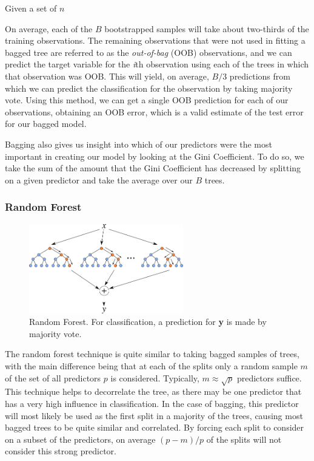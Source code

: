 \documentclass[preprint,12pt]{elsarticle}
\begin{document}
Given a set of $n$ 

On average, each of the $B$ bootstrapped samples will take about two-thirds of the training observations.  The remaining observations that were not used in fitting a bagged tree are referred to as the \textit{out-of-bag} (OOB) observations, and we can predict the target variable for the \textit{i}th observation using each of the trees in which that observation was OOB. This will yield, on average, $B/3$ predictions from which we can predict the classification for the observation by taking majority vote.\cite{ISLR} Using this method, we can get a single OOB prediction for each of our observations, obtaining an OOB error, which is a valid estimate of the test error for our bagged model.

Bagging also gives us insight into which of our predictors were the most important in creating our model by looking at the Gini Coefficient. To do so, we take the sum of the amount that the Gini Coefficient has decreased by splitting on a given predictor and take the average over our $B$ trees.

\subsubsection{Random Forest}


\begin{figure}[h]
	\centering
	\includegraphics[width=0.6\textwidth]{RF}
	\caption{Random Forest. For classification, a prediction for \textbf{y} is made by majority vote.}
\end{figure}

The random forest technique is quite similar to taking bagged  samples of trees, with the main difference being that at each of the splits only a random sample $m$ of the set of all predictors $p$ is considered. Typically, $m \approx \sqrt{p}$ predictors suffice. This technique helps to decorrelate the tree, as there may be one predictor that has a very high influence in classification. In the case of bagging, this predictor will most likely be used as the first split in a majority of the trees, causing most bagged trees to be quite similar and correlated. By forcing each split to consider on a subset of the predictors, on average $(p-m)/p$ of the splits will not consider this strong predictor\cite{Breiman2001}.
\end{document}
